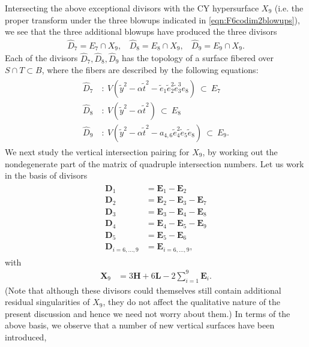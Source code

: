 \documentclass[11pt,oneside,english]{article}
\numberwithin{equation}{section}
\theoremstyle{definition}
\begin{document}
	Intersecting the above exceptional divisors with the CY hypersurface $ X_9$ (i.e. the proper transform under the three blowups indicated in \cref{eqn:F6codim2blowups}), we see that the three additional blowups have produced the three divisors
	\begin{align}
		\hat D_7 = {E}_7 \cap {X}_9,~~~~ \hat D_8 = {E}_8 \cap {X}_9,~~~~ \hat D_9 = {E}_9 \cap {X}_9.
	\end{align}
Each of the divisors $\hat D_7, \hat D_8, \hat D_9$ has the topology of a surface fibered over $S\cap T \subset B$, where the fibers are described by the following equations:	
	\begin{align}
	\begin{split}
		\hat D_7 ~&:~V(\tilde y^2 - \alpha \tilde t^2 - \tilde e_1\tilde e_2^2 \tilde e_3^3 e_8 ) ~\subset~{E}_7\\
		\hat D_8 ~&:~ V( \tilde y^2 - \alpha \tilde t^2)~ \subset ~ {E}_8 \\
		\hat D_9 ~&:~V( \tilde y^2 - \alpha \tilde t^2 - a_{4,6} \tilde e_4^2 \tilde e_5 \tilde e_8) ~\subset~ {E}_9.
	\end{split}
	\end{align}
We next study the vertical intersection pairing for $X_9$, by working out the nondegenerate part of the matrix of quadruple intersection numbers. Let us work in the basis of divisors
	\begin{align}
		\begin{split}
					\boldsymbol{D}_1 &= \boldsymbol{E}_1 - \boldsymbol{E}_2 \\
					\boldsymbol{D}_2 &= \boldsymbol{E}_2 - \boldsymbol{E}_3 - \boldsymbol{E}_7\\
					\boldsymbol{D}_3 &= \boldsymbol{E}_3 - \boldsymbol{E}_4 - \boldsymbol{E}_8\\
					\boldsymbol{D}_4 &= \boldsymbol{E}_4 - \boldsymbol{E}_5 -\boldsymbol{E}_9\\
					\boldsymbol{D}_5 &= \boldsymbol{E}_5 - \boldsymbol{E}_6 \\
					\boldsymbol{D}_{i = 6,\dots ,9} &= \boldsymbol{E}_{i = 6,\dots,9},
		\end{split}
	\end{align}
with
	\begin{align}
		\boldsymbol{X}_9 &= 3 \boldsymbol{H} + 6 \boldsymbol{L} - 2\sum_{i=1}^{9} \boldsymbol E_i.
	\end{align}
(Note that although these divisors could themselves still contain additional residual singularities of $X_9$, they do not affect the qualitative nature of the present discussion and hence we need not worry about them.) In terms of the above basis, we observe that a number of new vertical surfaces have been introduced,
\end{document}
